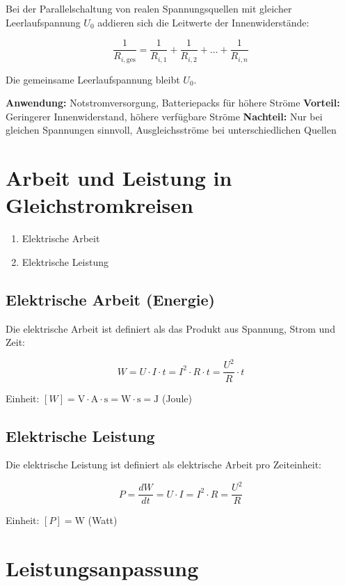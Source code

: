 \documentclass[
  11pt,
]{article}
\providecommand{\tightlist}{%
  \setlength{\itemsep}{0pt}\setlength{\parskip}{0pt}}
\begin{document}
Bei der Parallelschaltung von realen Spannungsquellen mit gleicher
Leerlaufspannung \(U_0\) addieren sich die Leitwerte der
Innenwiderstände:

\[\frac{1}{R_{i,\text{ges}}} = \frac{1}{R_{i,1}} + \frac{1}{R_{i,2}} + \dots + \frac{1}{R_{i,n}}\]

Die gemeinsame Leerlaufspannung bleibt \(U_0\).

\textbf{Anwendung:} Notstromversorgung, Batteriepacks für höhere Ströme
\textbf{Vorteil:} Geringerer Innenwiderstand, höhere verfügbare Ströme
\textbf{Nachteil:} Nur bei gleichen Spannungen sinnvoll,
Ausgleichsströme bei unterschiedlichen Quellen

\section{Arbeit und Leistung in
Gleichstromkreisen}\label{arbeit-und-leistung-in-gleichstromkreisen}

\begin{enumerate}
\def\labelenumi{\arabic{enumi}.}
\tightlist
\item
  Elektrische Arbeit
\item
  Elektrische Leistung
\end{enumerate}

\subsection{Elektrische Arbeit
(Energie)}\label{elektrische-arbeit-energie}

Die elektrische Arbeit ist definiert als das Produkt aus Spannung, Strom
und Zeit:

\[W = U \cdot I \cdot t = I^2 \cdot R \cdot t = \frac{U^2}{R} \cdot t\]

Einheit:
\([W] = \text{V} \cdot \text{A} \cdot \text{s} =\text{W} \cdot \text{s} = \text{J}\)
(Joule)

\subsection{Elektrische Leistung}\label{elektrische-leistung}

Die elektrische Leistung ist definiert als elektrische Arbeit pro
Zeiteinheit:

\[P = \frac{dW}{dt} = U \cdot I = I^2 \cdot R = \frac{U^2}{R}\]

Einheit: \([P] = \text{W}\) (Watt)

\section{Leistungsanpassung}\label{leistungsanpassung}
\end{document}
